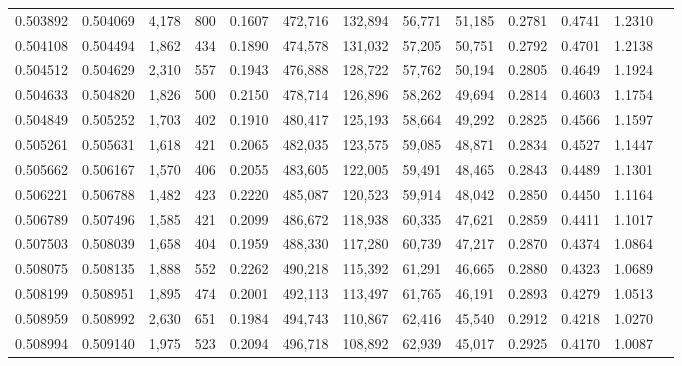 \begin{tabular}{rrrrrrrrrrrrr}
0.503892 & 0.504069 &  4,178 &   800 &                                     0.1607 & 472,716 & 132,894 &  56,771 &  51,185 & 0.2781 & 0.4741 & 1.2310 \\
0.504108 & 0.504494 &  1,862 &   434 &                                     0.1890 & 474,578 & 131,032 &  57,205 &  50,751 & 0.2792 & 0.4701 & 1.2138 \\
0.504512 & 0.504629 &  2,310 &   557 &                                     0.1943 & 476,888 & 128,722 &  57,762 &  50,194 & 0.2805 & 0.4649 & 1.1924 \\
0.504633 & 0.504820 &  1,826 &   500 &                                     0.2150 & 478,714 & 126,896 &  58,262 &  49,694 & 0.2814 & 0.4603 & 1.1754 \\
0.504849 & 0.505252 &  1,703 &   402 &                                     0.1910 & 480,417 & 125,193 &  58,664 &  49,292 & 0.2825 & 0.4566 & 1.1597 \\
0.505261 & 0.505631 &  1,618 &   421 &                                     0.2065 & 482,035 & 123,575 &  59,085 &  48,871 & 0.2834 & 0.4527 & 1.1447 \\
0.505662 & 0.506167 &  1,570 &   406 &                                     0.2055 & 483,605 & 122,005 &  59,491 &  48,465 & 0.2843 & 0.4489 & 1.1301 \\
0.506221 & 0.506788 &  1,482 &   423 &                                     0.2220 & 485,087 & 120,523 &  59,914 &  48,042 & 0.2850 & 0.4450 & 1.1164 \\
0.506789 & 0.507496 &  1,585 &   421 &                                     0.2099 & 486,672 & 118,938 &  60,335 &  47,621 & 0.2859 & 0.4411 & 1.1017 \\
0.507503 & 0.508039 &  1,658 &   404 &                                     0.1959 & 488,330 & 117,280 &  60,739 &  47,217 & 0.2870 & 0.4374 & 1.0864 \\
0.508075 & 0.508135 &  1,888 &   552 &                                     0.2262 & 490,218 & 115,392 &  61,291 &  46,665 & 0.2880 & 0.4323 & 1.0689 \\
0.508199 & 0.508951 &  1,895 &   474 &                                     0.2001 & 492,113 & 113,497 &  61,765 &  46,191 & 0.2893 & 0.4279 & 1.0513 \\
0.508959 & 0.508992 &  2,630 &   651 &                                     0.1984 & 494,743 & 110,867 &  62,416 &  45,540 & 0.2912 & 0.4218 & 1.0270 \\
0.508994 & 0.509140 &  1,975 &   523 &                                     0.2094 & 496,718 & 108,892 &  62,939 &  45,017 & 0.2925 & 0.4170 & 1.0087 \\

\end{tabular}
